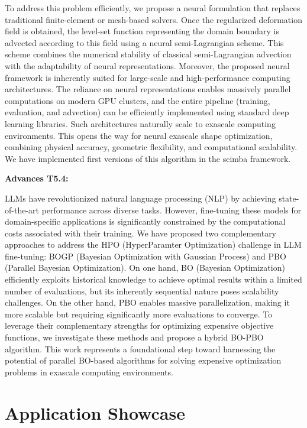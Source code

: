 To address this problem efficiently, we propose a neural formulation that replaces traditional finite-element or mesh-based solvers. Once the regularized deformation field is obtained, the level-set function representing the domain boundary is advected according to this field using a neural semi-Lagrangian scheme. This scheme combines the numerical stability of classical semi-Lagrangian advection with the adaptability of neural representations. Moreover, the proposed neural framework is inherently suited for large-scale and high-performance computing architectures. The reliance on neural representations enables massively parallel computations on modern GPU clusters, and the entire pipeline (training, evaluation, and advection) can be efficiently implemented using standard deep learning libraries. Such architectures naturally scale to exascale computing environments. This opens the way for neural exascale shape optimization, combining physical accuracy, geometric flexibility, and computational scalability. We have implemented first versions of this algorithm in the scimba framework.

{\bf Advances T5.4:}

LLMs have revolutionized natural language processing (NLP) by achieving state-of-the-art performance across diverse tasks. However, fine-tuning these models for domain-specific applications is significantly constrained by the computational costs associated with their training. We have proposed two complementary approaches to address the HPO (HyperParamter Optimization) challenge in LLM fine-tuning: BOGP (Bayesian Optimization with Gaussian Process) and PBO (Parallel Bayesian Optimization). On one hand, BO (Bayesian Optimization) efficiently exploits historical knowledge to achieve optimal results within a limited number of evaluations, but its inherently sequential nature poses scalability challenges. On the other hand, PBO enables massive parallelization, making it more scalable but requiring significantly more evaluations to converge. To leverage their complementary strengths for optimizing expensive objective functions, we investigate these methods and propose a hybrid BO-PBO algorithm. This work represents a foundational step toward harnessing the potential of parallel BO-based algorithms for solving expensive optimization problems in exascale computing environments.

\section{Application Showcase}

